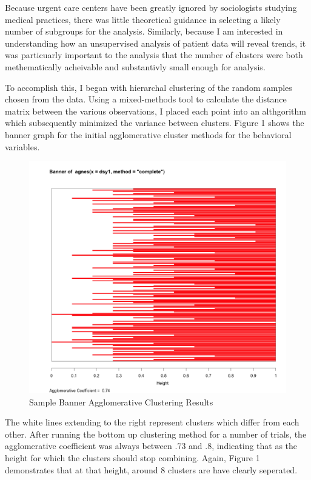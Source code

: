 \documentclass[12pt,twoside]{reedthesis}
\begin{document}
  Because urgent care centers have been greatly ignored by sociologists
  studying medical practices, there was little theoretical guidance in
  selecting a likely number of subgroups for the analysis. Similarly,
  because I am interested in understanding how an unsupervised analysis of
  patient data will reveal trends, it was particuarly important to the
  analysis that the number of clusters were both methematically acheivable
  and substantivly small enough for analysis.
  
  To accomplish this, I began with hierarchal clustering of the random
  samples chosen from the data. Using a mixed-methods tool to calculate
  the distance matrix between the various observations, I placed each
  point into an althgorithm which subsequently minimized the variance
  between clusters. Figure 1 shows the banner graph for the initial
  agglomerative cluster methods for the behavioral variables.
  
  \begin{figure}[htbp]
  \centering
  \includegraphics[scale = 0.35,angle = 0]{figures/banner.png}
  \caption[Sample Banner Agglomerative Clustering Results]{\normalsize{Sample Banner Agglomerative Clustering Results}}
  \label{fig:ban1}
  \end{figure}
  
  The white lines extending to the right represent clusters which differ
  from each other. After running the bottom up clustering method for a
  number of trials, the agglomerative coefficient was always between .73
  and .8, indicating that as the height for which the clusters should stop
  combining. Again, Figure 1 demonstrates that at that height, around 8
  clusters are have clearly seperated.
  
\end{document}
